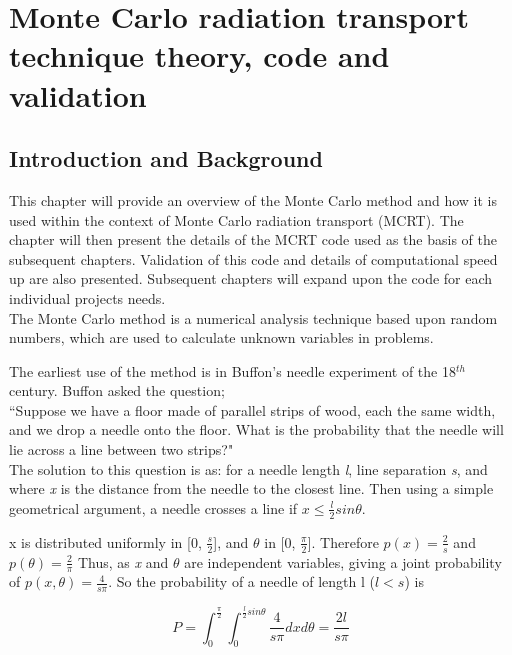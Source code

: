 \chapter{Monte Carlo radiation transport technique theory, code and validation}

\section{Introduction and Background}
This chapter will provide an overview of the Monte Carlo method and how it is used within the context of Monte Carlo radiation transport (MCRT). The chapter will then present the details of the MCRT code used as the basis of the subsequent chapters. Validation of this code and details of computational speed up are also presented. Subsequent chapters will expand upon the code for each individual projects needs.\\

The Monte Carlo method is a numerical analysis technique based upon random numbers, which are used to calculate unknown variables in problems. 

The earliest use of the method is in Buffon's needle experiment of the 18$^{th}$ century. Buffon asked the question; \\


``Suppose we have a floor made of parallel strips of wood, each the same width, and we drop a needle onto the floor. What is the probability that the needle will lie across a line between two strips?"
\\

The solution to this question is as:
for a needle length \textit{l}, line separation \textit{s}, and where \textit{x} is the distance from the needle to the closest line. Then using a simple geometrical argument, a needle crosses a line if $x \leq \tfrac{l}{2} sin \theta$.

x is distributed uniformly in [0, $\tfrac{s}{2}$], and $\theta$ in [0, $\tfrac{\pi}{2}$]. Therefore $p(x)=\tfrac{2}{s}$ and $p(\theta) = \tfrac{2}{\pi}$
Thus, as \textit{x} and $\theta$ are independent variables, giving a joint probability of $p(x,\theta) = \tfrac{4}{s \pi}$.
So the probability of a needle of length l ($l<s$) is

\begin{equation}
P=\int_0^{\frac{\pi}{2}}\int_0^{\frac{l}{2}sin\theta}\frac{4}{s\pi}dx d\theta = \frac{2 l}{s \pi}\label{eqn:buffon}
\end{equation}


